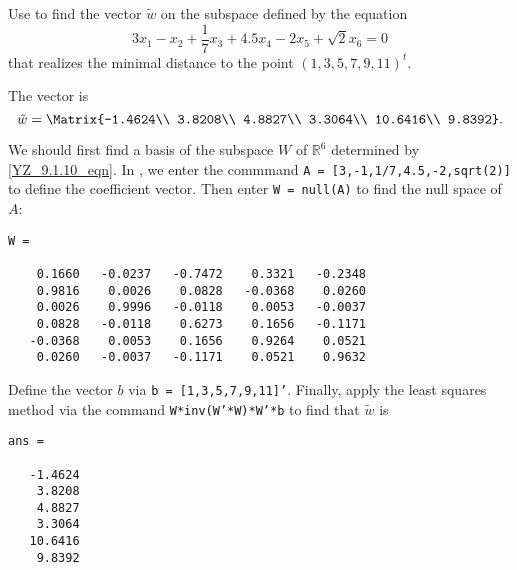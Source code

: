\begin{computerExercise} \label{YZ_9.1.10}
Use \Matlab to find the vector $\tilde{w}$ on the subspace defined by the equation
\begin{equation}
3x_1-x_2+\frac17x_3+4.5x_4-2x_5+\sqrt{2}x_6=0 \label{YZ_9.1.10_eqn}
\end{equation}
that realizes the minimal distance to the point $(1,3,5,7,9,11)^t$.
\begin{solution}

\ans The vector is 
\[
\tilde{w} =  \Matrix{-1.4624\\
    3.8208\\
    4.8827\\
    3.3064\\
   10.6416\\
    9.8392}.
\]

\soln We should first find a basis of the subspace $W$ of $\mathbb R^6$ determined by \eqref{YZ_9.1.10_eqn}. In \Matlab, we enter the commmand {\tt A = [3,-1,1/7,4.5,-2,sqrt(2)]} to define the coefficient vector. Then enter {\tt W  = null(A)} to find the null space of $A$:
\begin{verbatim}
W =

    0.1660   -0.0237   -0.7472    0.3321   -0.2348
    0.9816    0.0026    0.0828   -0.0368    0.0260
    0.0026    0.9996   -0.0118    0.0053   -0.0037
    0.0828   -0.0118    0.6273    0.1656   -0.1171
   -0.0368    0.0053    0.1656    0.9264    0.0521
    0.0260   -0.0037   -0.1171    0.0521    0.9632
\end{verbatim}

Define the vector $b$ via {\tt b = [1,3,5,7,9,11]'}. Finally, apply the least squares method 
via the command {\tt W*inv(W'*W)*W'*b} to find that $\tilde{w}$ is 
\begin{verbatim}
ans =

   -1.4624
    3.8208
    4.8827
    3.3064
   10.6416
    9.8392
\end{verbatim}
\end{solution}
\end{computerExercise}
